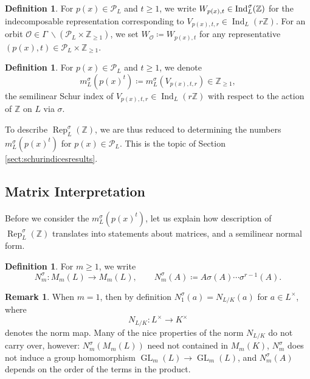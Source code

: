 \documentclass[10pt, reqno, hidelinks]{amsart}
\newcommand{\OO}{\mathcal{O}}
\DeclareMathOperator{\Rep}{Rep}
\DeclareMathOperator{\Ind}{Ind}
\DeclareMathOperator{\GL}{GL}
\newcommand{\bZ}{{\mathbb Z}}
\newcommand{\sP}{{\mathcal P}}
\numberwithin{thm}{subsection}
\theoremstyle{definition}
\newtheorem{defn}[thm]{Definition}
\newtheorem{remark}[thm]{Remark}
\begin{document}
\begin{defn}
    For $p(x) \in \sP_L$ and $t \geq 1$, we write $W_{p(x),t} \in \Ind_{L}^{\hspace{0.05em} \sigma}(\bZ)$ for the indecomposable representation corresponding to $V_{p(x),t,r} \in \Ind_L(r\bZ)$. For an orbit $\OO \in \Gamma \: \backslash (\sP_L \times \bZ_{\geq 1})$, we set $W_{\OO} \coloneqq W_{p(x),t}$ for any representative $(p(x),t) \in \sP_L \times \bZ_{\geq 1}$.
\end{defn}

\begin{defn}\label{def:schurindexnotation}
	For $p(x) \in \sP_L$ and $t \geq 1$, we denote
	\[
	m_L^{\sigma}(p(x)^t) \coloneqq m_L^{\sigma}(V_{p(x), t, r}) \in \bZ_{\geq 1},
	\]
	the semilinear Schur index of $V_{p(x), t, r} \in \Ind_L(r\bZ)$ with respect to the action of $\bZ$ on $L$ via $\sigma$.
\end{defn}

To describe $\Rep_L^{\sigma}(\bZ)$, we are thus reduced to determining the numbers $m_L^{\sigma}(p(x)^t)$ for $p(x) \in \sP_L$. This is the topic of Section \ref{sect:schurindicesresults}.

\subsection{Matrix Interpretation}\label{sect:matrixsemilinearpov}

Before we consider the $m_L^{\sigma}(p(x)^t)$, let us explain how description of $\Rep_L^{\sigma}(\bZ)$ translates into statements about matrices, and a semilinear normal form.

\begin{defn}
    For $m \geq 1$, we write
    \[
    N_m^{\sigma} \colon M_m(L) \rightarrow M_m(L), \qquad N_{m}^{\sigma}(A) \coloneqq A \sigma(A) \cdots \sigma^{r-1}(A).
    \]
\end{defn}

\begin{remark}
    When $m = 1$, then by definition $N_{1}^{\sigma}(a) = N_{L/K}(a)$ for $a \in L^{\times}$, where
    \[
    N_{L/K} \colon L^{\times} \rightarrow K^{\times}
    \]
    denotes the norm map. Many of the nice properties of the norm $N_{L/K}$ do not carry over, however: $N_m^{\sigma}(M_m(L))$ need not contained in $M_m(K)$, $N_{m}^{\sigma}$ does not induce a group homomorphism $\GL_m(L) \rightarrow \GL_m(L)$, and $N_{m}^{\sigma}(A)$ depends on the order of the terms in the product.
\end{remark}
\end{document}
